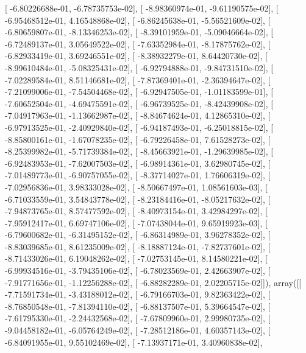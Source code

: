 \documentclass{article}
\begin{document}
       [ -6.80226688e-01,  -6.78735753e-02],
       [ -8.98360974e-01,  -9.61190575e-02],
       [ -6.95468512e-01,   4.16548868e-02],
       [ -6.86245638e-01,  -5.56521609e-02],
       [ -6.80659807e-01,  -8.13346253e-02],
       [ -8.39101959e-01,  -5.09046664e-02],
       [ -6.72489137e-01,   3.05649522e-02],
       [ -7.63352984e-01,  -8.17875762e-02],
       [ -6.82933419e-01,   3.69246551e-02],
       [ -8.38932279e-01,   8.64420730e-02],
       [ -8.99610484e-01,  -5.08325431e-02],
       [ -6.92794888e-01,  -9.84731510e-02],
       [ -7.02289584e-01,   8.51146681e-02],
       [ -7.87369401e-01,  -2.36394647e-02],
       [ -7.21099006e-01,  -7.54504468e-02],
       [ -6.92947505e-01,  -1.01183599e-01],
       [ -7.60652504e-01,  -4.69475591e-02],
       [ -6.96739525e-01,  -8.42439908e-02],
       [ -7.04917963e-01,  -1.13662987e-02],
       [ -8.84674624e-01,   4.12865310e-02],
       [ -6.97913525e-01,  -2.40929840e-02],
       [ -6.94187493e-01,  -6.25018815e-02],
       [ -8.85800161e-01,  -1.67078235e-02],
       [ -6.79226458e-01,   7.61528273e-02],
       [ -8.25399982e-01,  -5.71739384e-02],
       [ -8.45663921e-01,  -1.29639985e-02],
       [ -6.92483953e-01,  -7.62007503e-02],
       [ -6.98914361e-01,   3.62980745e-02],
       [ -7.01489773e-01,  -6.90757055e-02],
       [ -8.37714027e-01,   1.76606319e-02],
       [ -7.02956836e-01,   3.98333028e-02],
       [ -8.50667497e-01,   1.08561603e-03],
       [ -6.71033559e-01,   3.54843778e-02],
       [ -8.23184416e-01,  -8.05217632e-02],
       [ -7.94873765e-01,   8.57477592e-02],
       [ -8.40973154e-01,   3.42984297e-02],
       [ -7.95912417e-01,   6.69747106e-02],
       [ -7.07438044e-01,   9.65919923e-03],
       [ -6.79600682e-01,  -6.31495152e-02],
       [ -6.86314989e-01,   3.96278352e-02],
       [ -8.83039685e-01,   8.61235009e-02],
       [ -8.18887124e-01,  -7.82737601e-02],
       [ -8.71433026e-01,   6.19048262e-02],
       [ -7.02753145e-01,   8.14580221e-02],
       [ -6.99934516e-01,  -3.79435106e-02],
       [ -6.78023569e-01,   2.42663907e-02],
       [ -7.91771656e-01,  -1.12256288e-02],
       [ -6.88282289e-01,   2.02205715e-02]]), array([[ -7.71591734e-01,  -3.43188012e-02],
       [ -6.79166703e-01,   9.82363422e-02],
       [ -8.76850548e-01,  -7.81394110e-02],
       [ -6.88137507e-01,   5.39664547e-02],
       [ -7.61795330e-01,  -2.24432568e-02],
       [ -7.67809960e-01,   2.99980735e-02],
       [ -9.04458182e-01,  -6.05764249e-02],
       [ -7.28512186e-01,   4.60357143e-02],
       [ -6.84091955e-01,   9.55102469e-02],
       [ -7.13937171e-01,   3.40960838e-02],
\end{document}
